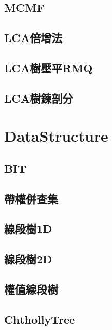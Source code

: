     \subsection{MCMF}
         \columnbreak
    \subsection{LCA倍增法}
         \columnbreak
    \subsection{LCA樹壓平RMQ}
        
    \subsection{LCA樹鍊剖分}
        
\clearpage

\section{DataStructure}
    \subsection{BIT}
        
    \subsection{帶權併查集}
        
         \columnbreak
    \subsection{線段樹1D}
         \columnbreak
    \subsection{線段樹2D}
         \columnbreak
    \subsection{權值線段樹}
         \columnbreak
    \subsection{ChthollyTree}
         

